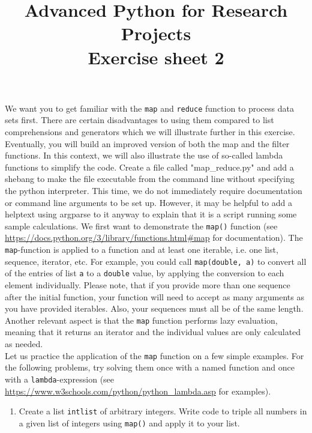 \documentclass[]{erlangen-problemset}
\title{{\Large Advanced Python for Research Projects} \\[0.3cm] 
Exercise sheet 2}
\begin{document}


\begin{problem}[title={Working with advanced data processing functions}]
\noindent
We want you to get familiar with the \texttt{map} and \texttt{reduce} function to process data sets first.
There are certain disadvantages to using them compared to list comprehensions and generators which we will illustrate further in this exercise. 
Eventually, you will build an improved version of both the map and the filter functions.
In this context, we will also illustrate the use of so-called lambda functions to simplify the code. 
\Question Create a file called "map\_reduce.py" and add a shebang to make the file executable from the command line without specifying the python interpreter. 
This time, we do not immediately require documentation or command line arguments to be set up. 
However, it may be helpful to add a helptext using argparse to it anyway to explain that it is a script running some sample calculations. 
\Question We first want to demonstrate the \texttt{map()} function (see \url{https://docs.python.org/3/library/functions.html#map} for documentation). 
The \texttt{map}-function is applied to a function and at least one iterable, i.e. one list, sequence, iterator, etc. 
For example, you could call \texttt{map(double, a)} to convert all of the entries of list \texttt{a} to a \texttt{double} value, by applying the conversion to each element individually. 
Please note, that if you provide more than one sequence after the initial function, your function will need to accept as many arguments as you have provided iterables. 
Also, your sequences must all be of the same length. \\
Another relevant aspect is that the \texttt{map} function performs lazy evaluation, meaning that it returns an iterator and the individual values are only calculated as needed. \\
Let us practice the application of the \texttt{map} function on a few simple examples. 
For the following problems, try solving them once with a named function and once with a \texttt{lambda}-expression (see \url{https://www.w3schools.com/python/python_lambda.asp} for examples).
\begin{enumerate}
	\item Create a list \texttt{intlist} of arbitrary integers. 
	Write code to triple all numbers in a given list of integers using \texttt{map()} and apply it to your list. 

\end{enumerate}
\end{problem}
\end{document}
